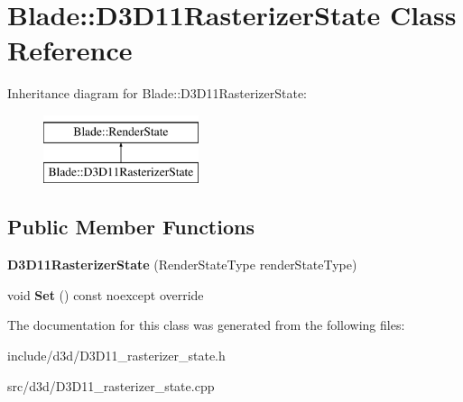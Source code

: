 \hypertarget{class_blade_1_1_d3_d11_rasterizer_state}{}\section{Blade\+:\+:D3\+D11\+Rasterizer\+State Class Reference}
\label{class_blade_1_1_d3_d11_rasterizer_state}
Inheritance diagram for Blade\+:\+:D3\+D11\+Rasterizer\+State\+:\begin{figure}[H]
\begin{center}
\leavevmode
\includegraphics[height=2.000000cm]{class_blade_1_1_d3_d11_rasterizer_state}
\end{center}
\end{figure}
\subsection*{Public Member Functions}
\begin{DoxyCompactItemize}
\item 
\mbox{\label{class_blade_1_1_d3_d11_rasterizer_state_a87077b9acce398c36a873069cf52d108}} 
{\bfseries D3\+D11\+Rasterizer\+State} (Render\+State\+Type render\+State\+Type)
\item 
\mbox{\label{class_blade_1_1_d3_d11_rasterizer_state_a967a3044da521170cdce48ea5e5d30d9}} 
void {\bfseries Set} () const noexcept override
\end{DoxyCompactItemize}


The documentation for this class was generated from the following files\+:\begin{DoxyCompactItemize}
\item 
include/d3d/D3\+D11\+\_\+rasterizer\+\_\+state.\+h\item 
src/d3d/D3\+D11\+\_\+rasterizer\+\_\+state.\+cpp\end{DoxyCompactItemize}
